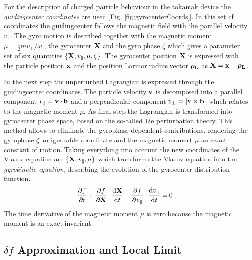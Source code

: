 For the description of charged particle behaviour in the tokamak device the \textit{guidingcenter coordinates} are used [Fig. \ref{fig:gyrocenterCoords}]. In this set of coordinates the guidingcenter follows the magnetic field with the parallel velocity $v_{\parallel}$. The gyro motion is described together with the magnetic moment $\mu = \frac{1}{2}mv_\perp/\omega_\mathrm{c}$, the gyrocenter $\boldsymbol{\mathbf{X}}$ and the gyro phase $\zeta$ which gives a parameter set of six quantities $\{\boldsymbol{\mathbf{X}}, v_{\parallel}, \mu, \zeta\}$. The gyrocenter position $\boldsymbol{\mathbf{X}}$ is expressed with the particle position $\boldsymbol{\mathbf{x}}$ and the position Larmor radius vector $\boldsymbol{\mathbf{\rho_\mathrm{L}}}$ as $\boldsymbol{\mathbf{X}} = \boldsymbol{\mathbf{x}} - \boldsymbol{\mathbf{\rho_\mathrm{L}}}$.


In the next step the unperturbed Lagrangian is expressed through the guidingcenter coordinates. The particle velocity $\boldsymbol{\mathbf{v}}$ is decomposed into a parallel component $v_\parallel = \boldsymbol{\mathbf{v}} \cdot \boldsymbol{\mathbf{b}}$ and a perpendicular component $v_\perp = |\boldsymbol{\mathbf{v}} \times \boldsymbol{\mathbf{b}}|$ which relates to the magnetic moment $\mu$. As final step the Lagrangian is transformed into gyrocenter phase space, based on the so-called Lie perturbation theory. This method allows to eliminate the gyrophase-dependent contributions, rendering the gyrophase $\zeta$ an ignorable coordinate and the magnetic moment $\mu$ an exact constant of motion. \cite{Garbet2010,Cary1981,Cary1983} 
Taking everything into account the new coordinates of the Vlasov equation are $\{\boldsymbol{\mathbf{X}}, v_{\parallel}, \mu\}$ which transforms the Vlasov equation into the \textit{gyrokinetic equation}, describing the evolution of the gyrocenter distribution function.
\begin{gather}
	\frac{\partial f}{\partial t} + \frac{\partial f}{\partial \boldsymbol{\mathbf{X}}} \cdot \frac{\mathrm{d}\boldsymbol{\mathbf{X}}}{\mathrm{d}t} + \frac{\partial f}{\partial v_\parallel} \cdot \frac{\mathrm{d}v_\parallel}{\mathrm{d}t} = 0~.
	\label{eq:gyrokinetic}
\end{gather}
The time derivative of the magnetic moment $\mu$ is zero because the magnetic moment is an exact invariant. 

\subsection{$\delta f$ Approximation and Local Limit}
\label{sub:application}

